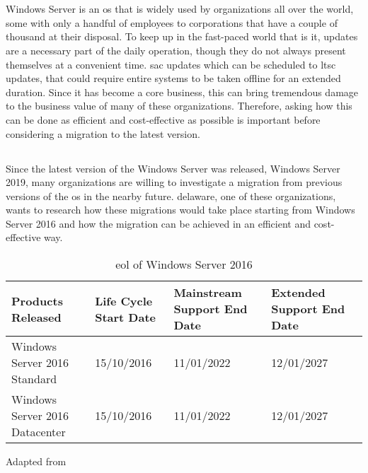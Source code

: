 \chapter{}
\label{ch:inleiding}
Windows Server is an \acrfull{os} that is widely used by organizations all over the world, some with only a handful of employees to corporations that have a couple of thousand at their disposal. 
To keep up in the fast-paced world that is \acrfull{it}, updates are a necessary part of the daily operation, though they do not always present themselves at a convenient time. 
\acrfull{sac} updates which can be scheduled to \acrfull{ltsc} updates, that could require entire systems to be taken offline for an extended duration. 
Since \acrshort{it} has become a core business, this can bring tremendous damage to the business value of many of these organizations.
Therefore, asking how this can be done as efficient and cost-effective as possible is important before considering a migration to the latest version. 

\section{}
\label{sec:probleemstelling}
Since the latest version of the Windows Server was released, Windows Server 2019, many organizations are willing to investigate a migration from previous versions of the \acrshort{os} in the nearby future. 
delaware, one of these organizations, wants to research how these migrations would take place starting from Windows Server 2016 and how the migration can be achieved in an efficient and cost-effective way. 

\begin{table}[htb!]
	\centering
	\begin{adjustbox}{width=1\textwidth}
		\begin{tabular}{l|l|l|ll}
			Products Released & Life Cycle Start Date & Mainstream Support End Date & Extended Support End Date &\\
			\hline
			Windows Server 2016 Standard & 15/10/2016 & 11/01/2022 & 12/01/2027 &\\
			Windows Server 2016 Datacenter & 15/10/2016 & 11/01/2022 & 12/01/2027 &\\
		\end{tabular}
	\end{adjustbox}
	\caption[\acrshort{eol} \acrshort{ws}2016]{\acrshort{eol} of Windows Server 2016}
	\scriptsize	
	Adapted from \cite{MicrosoftEOL2019}
	\label{tab:EOL2016}
\end{table}

